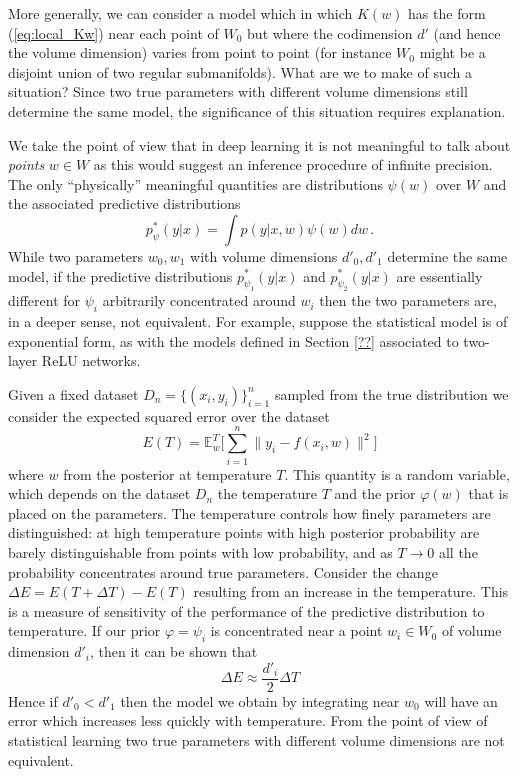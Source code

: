 \documentclass{article} %
\def\lto{\longrightarrow}
\begin{document}
More generally, we can consider a model which in which $K(w)$ has the form (\ref{eq:local_Kw})  near each point of $W_0$ but where the codimension $d'$ (and hence the volume dimension) varies from point to point (for instance $W_0$ might be a disjoint union of two regular submanifolds). What are we to make of such a situation? Since two true parameters with different volume dimensions still determine the same model, the significance of this situation requires explanation.

We take the point of view that in deep learning it is not meaningful to talk about \emph{points} $w \in W$ as this would suggest an inference procedure of infinite precision. The only ``physically'' meaningful quantities are distributions $\psi(w)$ over $W$ and the associated predictive distributions
\[
p^*_\psi(y|x) = \int p(y|x,w) \psi(w) dw\,.
\]
While two parameters $w_0, w_1$ with volume dimensions $d'_0, d'_1$ determine the same model, if the predictive distributions $p^*_{\psi_1}(y|x)$ and $p^*_{\psi_2}(y|x)$ are essentially different for $\psi_i$ arbitrarily concentrated around $w_i$ then the two parameters are, in a deeper sense, not equivalent. For example, suppose the statistical model is of exponential form, as with the models defined in Section \ref{??} associated to two-layer ReLU networks. 

Given a fixed dataset $D_n = \{ (x_i,y_i) \}_{i=1}^n$ sampled from the true distribution we consider the expected squared error over the dataset
\[
E(T) = \mathbb{E}_w^T\Big[ \sum_{i=1}^n \| y_i - f(x_i, w) \|^2 \Big]
\]
where $w$ from the posterior at temperature $T$. This quantity is a random variable, which depends on the dataset $D_n$ the temperature $T$ and the prior $\varphi(w)$ that is placed on the parameters. The temperature controls how finely parameters are distinguished: at high temperature points with high posterior probability are barely distinguishable from points with low probability, and as $T \lto 0$ all the probability concentrates around true parameters. Consider the change $\Delta E = E(T + \Delta T) - E(T)$ resulting from an increase in the temperature. This is a measure of sensitivity of the performance of the predictive distribution to temperature. If our prior $\varphi = \psi_i$ is concentrated near a point $w_i \in W_0$ of volume dimension $d'_i$, then it can be shown that
\[
\Delta E \approx \frac{d'_i}{2} \Delta T
\]
Hence if $d'_0 < d'_1$ then the model we obtain by integrating near $w_0$ will have an error which increases less quickly with temperature. From the point of view of statistical learning two true parameters with different volume dimensions are not equivalent.
\end{document}
